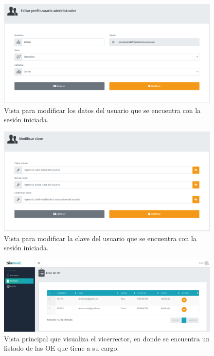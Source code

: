 \begin{figure}[h]
    \centering
    \includegraphics[width=1\textwidth]{Imagenes/EditarPerfil.PNG}
    \caption{\label{fig: EditarPerfil}Vista para modificar los datos del usuario que se encuentra con la sesión iniciada.}
\end{figure}

\begin{figure}[h]
    \centering
    \includegraphics[width=1\textwidth]{Imagenes/ModificarClave.PNG}
    \caption{\label{fig: EditarClave}Vista para modificar la clave del usuario que se encuentra con la sesión iniciada.}
\end{figure}

\begin{figure}[h]
    \centering
    \includegraphics[width=1\textwidth]{Imagenes/PrincipalVicerector.PNG}
    \caption{\label{fig: PrincipalVicerector}Vista principal que visualiza el vicerrector, en donde se encuentra un listado de las OE que tiene a su cargo.}
\end{figure}